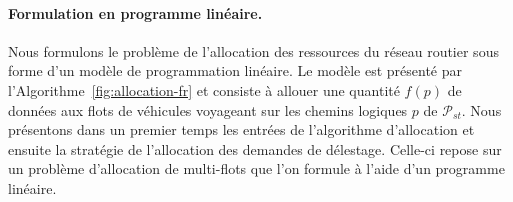  
 
 
\paragraph{Formulation en programme linéaire.} 
Nous formulons le problème de l’allocation des ressources du réseau routier sous forme d’un modèle de programmation linéaire. Le modèle est présenté par l’Algorithme~\ref{fig:allocation-fr} et consiste à allouer une quantité $f(p)$ de données aux flots de véhicules voyageant sur les chemins logiques $p$ de $\mathcal{P}_{st}$. Nous présentons dans un premier temps les entrées de l’algorithme d’allocation et ensuite la stratégie de l’allocation des demandes de délestage. Celle-ci repose sur un problème d’allocation de multi-flots que l’on formule à l’aide d’un programme linéaire. 
 
